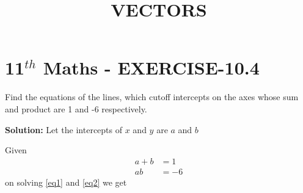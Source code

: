 \documentclass[10pt]{article}
\newcommand{\solution}{\noindent \textbf{Solution: }}
\begin{document}
\begin{center}
\title{\textbf{VECTORS}}
\date{\vspace{-5ex}} %
\maketitle
\end{center}

\section*{11$^{th}$ Maths - EXERCISE-10.4}

Find the  equations of the lines, which cutoff intercepts on the axes  whose sum and product are 1 and -6 respectively.

\solution
Let the intercepts of $x$ and $y$ are $a$ and $b$\\

\begin{table}[!h]
\centering

\caption{}
\label{Inputs}
\end{table}
Given
\begin{align}
a+b&=1
\label{eq1}\\
ab&=-6
\label{eq2}
\end{align} 
on solving \eqref{eq1} and \eqref{eq2} we get\\
\end{document}
